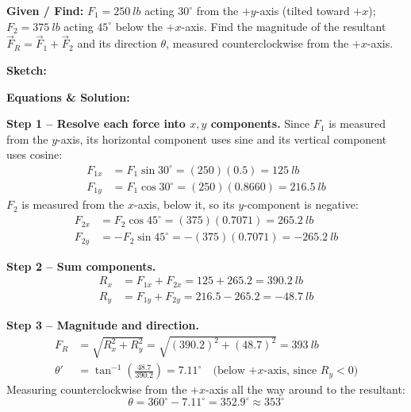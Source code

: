 \documentclass[11pt]{article}
\newcommand{\eqlabel}[1]{\textbf{#1}}
\begin{document}
\textbf{Given / Find:} $F_1 = \SI{250}{lb}$ acting $30^\circ$ from the $+y$-axis (tilted toward $+x$); $F_2 = \SI{375}{lb}$ acting $45^\circ$ below the $+x$-axis. Find the magnitude of the resultant $\vec{F}_R = \vec{F}_1+\vec{F}_2$ and its direction $\theta$, measured counterclockwise from the $+x$-axis.

\textbf{Sketch:}
\begin{center}
\end{center}

\textbf{Equations \& Solution:}

\eqlabel{Step 1 -- Resolve each force into $x,y$ components.}
Since $F_1$ is measured from the $y$-axis, its horizontal component uses sine and its vertical component uses cosine:
\begin{align*}
    F_{1x} &= F_1 \sin 30^\circ = (250)(0.5) = \SI{125}{lb} \\
    F_{1y} &= F_1 \cos 30^\circ = (250)(0.8660) = \SI{216.5}{lb}
\end{align*}
$F_2$ is measured from the $x$-axis, below it, so its $y$-component is negative:
\begin{align*}
    F_{2x} &= F_2 \cos 45^\circ = (375)(0.7071) = \SI{265.2}{lb} \\
    F_{2y} &= -F_2 \sin 45^\circ = -(375)(0.7071) = \SI{-265.2}{lb}
\end{align*}

\eqlabel{Step 2 -- Sum components.}
\begin{align*}
    R_x &= F_{1x}+F_{2x} = 125 + 265.2 = \SI{390.2}{lb} \\
    R_y &= F_{1y}+F_{2y} = 216.5 - 265.2 = \SI{-48.7}{lb}
\end{align*}

\eqlabel{Step 3 -- Magnitude and direction.}
\begin{align*}
    F_R &= \sqrt{R_x^2+R_y^2} = \sqrt{(390.2)^2+(48.7)^2} = \SI{393}{lb} \\
    \theta' &= \tan^{-1}\!\left(\frac{48.7}{390.2}\right) = 7.11^\circ \quad \text{(below $+x$-axis, since $R_y<0$)}
\end{align*}
Measuring counterclockwise from the $+x$-axis all the way around to the resultant:
\[
    \theta = 360^\circ - 7.11^\circ = 352.9^\circ \approx 353^\circ
\]
\end{document}

